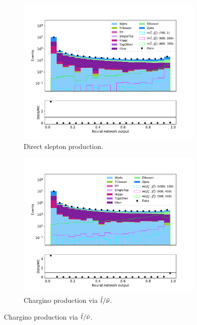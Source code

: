 \begin{figure}[H]
    \centering
    \begin{subfigure}[t!]{0.49\textwidth}
        \includegraphics[width = \textwidth]{Figures/Stacked/stackedplot_NN_Low_level_slepslep.pdf}
        \caption{Direct slepton production.}
        \label{fig:SlepslepNNLow}
    \end{subfigure}
    \begin{subfigure}[t!]{0.49\textwidth}
        \includegraphics[width = \textwidth]{Figures/Stacked/stackedplot_NN_Low_level_slepsnu.pdf}
        \caption{Chargino production via $\Tilde{l}/\Tilde{\nu}$.}

\end{subfigure}
\end{figure}
